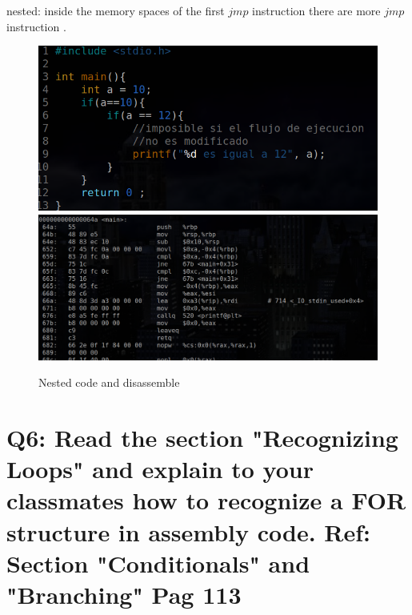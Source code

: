 \documentclass[10pt,a4paper]{article} %
\begin{document}
        nested:
        inside the memory spaces of the first $ jmp  $ instruction there are
        more $ jmp  $ instruction .
        \begin{figure}[h!]
            \centering
            \includegraphics[width=0.9\linewidth]{nestedcode.png}
            \includegraphics[width=0.9\linewidth]{nesteddis.png}
            \caption{Nested code and disassemble}
            \label{nested}
        \end{figure}

    \newpage
    \section{Q6: Read the section "Recognizing Loops" and explain to your
        classmates how to recognize a FOR structure in assembly code.
        Ref: Section "Conditionals" and "Branching" Pag 113}
\end{document}
